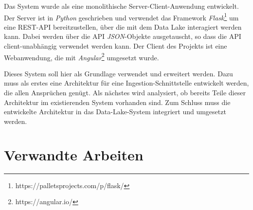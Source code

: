 Das System wurde als eine monolithische Server-Client-Anwendung entwickelt.
Der Server ist in \textit{Python} geschrieben und verwendet das Framework \textit{Flask}\footnote{https://palletsprojects.com/p/flask/} um eine REST-API bereitzustellen, über die mit dem Data Lake interagiert werden kann.
Dabei werden über die API \textit{JSON}-Objekte ausgetauscht, so dass die API client-unabhängig verwendet werden kann.
Der Client des Projekts ist eine Webanwendung, die mit \textit{Angular}\footnote{https://angular.io/} umgesetzt wurde.

Dieses System soll hier als Grundlage verwendet und erweitert werden.
Dazu muss als erstes eine Architektur für eine Ingestion-Schnittstelle entwickelt werden, die allen Ansprüchen genügt.
Als nächstes wird analysiert, ob bereits Teile dieser Architektur im existierenden System vorhanden sind.
Zum Schluss muss die entwickelte Architektur in das Data-Lake-System integriert und umgesetzt werden.

\section{Verwandte Arbeiten}